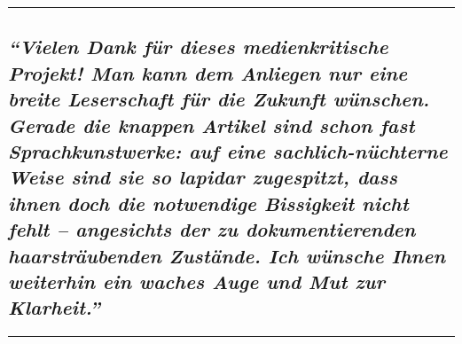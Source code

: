 \begin{center}\rule{0.5\linewidth}{\linethickness}\end{center}

\hypertarget{vielen-dank-fuxfcr-dieses-medienkritische-projekt-man-kann-dem-anliegen-nur-eine-breite-leserschaft-fuxfcr-die-zukunft-wuxfcnschen-gerade-die-knappen-artikel-sind-schon-fast-sprachkunstwerke-auf-eine-sachlich-nuxfcchterne-weise-sind-sie-so-lapidar-zugespitzt-dass-ihnen-doch-die-notwendige-bissigkeit-nicht-fehlt--angesichts-der-zu-dokumentierenden-haarstruxe4ubenden-zustuxe4nde-ich-wuxfcnsche-ihnen-weiterhin-ein-waches-auge-und-mut-zur-klarheit}{%
\subsection{\texorpdfstring{\emph{``Vielen Dank für dieses
medien­kritische Projekt! Man kann dem Anliegen nur eine breite
Leserschaft für die Zukunft wünschen. Gerade die knappen Artikel sind
schon fast Sprach­kunst­werke: auf eine sachlich-nüchterne Weise sind
sie so lapidar zugespitzt, dass ihnen doch die notwendige Bissigkeit
nicht fehlt -- angesichts der zu doku­men­tierenden haar­sträu­benden
Zustände. Ich wünsche Ihnen weiterhin ein waches Auge und Mut zur
Klarheit.''}}{``Vielen Dank für dieses medien­kritische Projekt! Man kann dem Anliegen nur eine breite Leserschaft für die Zukunft wünschen. Gerade die knappen Artikel sind schon fast Sprach­kunst­werke: auf eine sachlich-nüchterne Weise sind sie so lapidar zugespitzt, dass ihnen doch die notwendige Bissigkeit nicht fehlt -- angesichts der zu doku­men­tierenden haar­sträu­benden Zustände. Ich wünsche Ihnen weiterhin ein waches Auge und Mut zur Klarheit.''}}\label{vielen-dank-fuxfcr-dieses-medienkritische-projekt-man-kann-dem-anliegen-nur-eine-breite-leserschaft-fuxfcr-die-zukunft-wuxfcnschen-gerade-die-knappen-artikel-sind-schon-fast-sprachkunstwerke-auf-eine-sachlich-nuxfcchterne-weise-sind-sie-so-lapidar-zugespitzt-dass-ihnen-doch-die-notwendige-bissigkeit-nicht-fehlt--angesichts-der-zu-dokumentierenden-haarstruxe4ubenden-zustuxe4nde-ich-wuxfcnsche-ihnen-weiterhin-ein-waches-auge-und-mut-zur-klarheit}}

\begin{center}\rule{0.5\linewidth}{\linethickness}\end{center}

